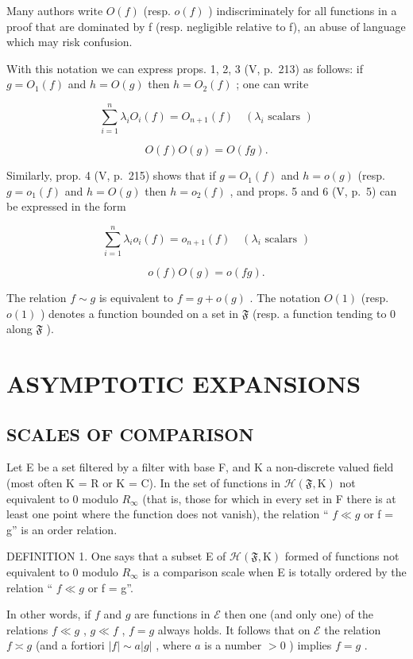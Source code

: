Many authors write \(O(f)\) (resp. \(o(f)\) ) indiscriminately for all functions in a proof that are dominated by f (resp. negligible relative to f), an abuse of language which may risk confusion.

With this notation we can express props. 1, 2, 3 (V, p.~213) as follows: if \(g = O_1(f)\) and \(h = O(g)\) then \(h = O_2(f)\) ; one can write

\[
\sum_ {i = 1} ^ {n} \lambda_ {i} O _ {i} (f) = O _ {n + 1} (f) \quad (\lambda_ {i} \text {   scalars })\tag{1}
\]

\[
O (f) O (g) = O (f g).\tag{2}
\]

Similarly, prop. 4 (V, p.~215) shows that if \(g = O_1(f)\) and \(h = o(g)\) (resp. \(g = o_1(f)\) and \(h = O(g)\) then \(h = o_2(f)\) , and props. 5 and 6 (V, p.~5) can be expressed in the form

\[
\sum_ {i = 1} ^ {n} \lambda_ {i} o _ {i} (f) = o _ {n + 1} (f) \quad (\lambda_ {i} \text {   scalars })\tag{3}
\]

\[
o (f) O (g) = o (f g).\tag{4}
\]

The relation \(f \sim g\) is equivalent to \(f = g + o(g)\) . The notation \(O(1)\) (resp. \(o(1)\) ) denotes a function bounded on a set in \(\mathfrak{F}\) (resp. a function tending to 0 along \(\mathfrak{F}\) ).

\section{ASYMPTOTIC EXPANSIONS}

\subsection{SCALES OF COMPARISON}

Let E be a set filtered by a filter with base F, and K a non-discrete valued field (most often K = R or K = C). In the set of functions in \(\mathcal{H}(\mathfrak{F}, \mathrm{K})\) not equivalent to 0 modulo \(R_{\infty}\) (that is, those for which in every set in F there is at least one point where the function does not vanish), the relation `` \(f \ll g\) or f = g'' is an order relation.

DEFINITION 1. One says that a subset E of \(\mathcal{H}(\mathfrak{F},\mathrm{K})\) formed of functions not equivalent to 0 modulo \(R_{\infty}\) is a comparison scale when E is totally ordered by the relation `` \(f \ll g\) or f = g''.

In other words, if \(f\) and \(g\) are functions in \(\mathcal{E}\) then one (and only one) of the relations \(f \ll g\) , \(g \ll f\) , \(f = g\) always holds. It follows that on \(\mathcal{E}\) the relation \(f \asymp g\) (and a fortiori \(|f| \sim a |g|\) , where \(a\) is a number \(> 0\) ) implies \(f = g\) .

